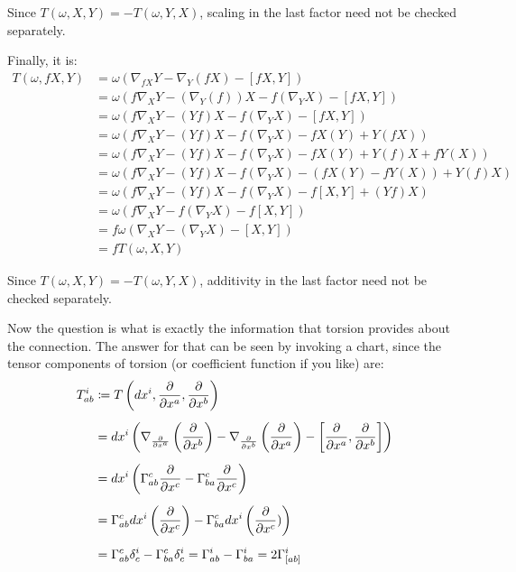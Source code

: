 Since $T(\omega,X,Y) = - T(\omega,Y,X)$, scaling in the last factor need not be checked separately.

\item Finally, it is:
\begin{align*}
T(\omega, fX, Y) & = \omega(\nabla_{fX} Y - \nabla_Y (fX) - [fX,Y]) \\
& = \omega(f\nabla_{X} Y - (\nabla_Y (f))X - f(\nabla_Y X) - [fX,Y]) \\
& = \omega(f\nabla_{X} Y - (Yf)X - f(\nabla_Y X) - [fX,Y]) \\
& = \omega(f\nabla_{X} Y - (Yf)X - f(\nabla_Y X) - fX(Y) + Y(fX)) \\
& = \omega(f\nabla_{X} Y - (Yf)X - f(\nabla_Y X) - fX(Y) + Y(f)X + fY (X))\\
& = \omega(f\nabla_{X} Y - (Yf)X - f(\nabla_Y X) - (fX(Y) - fY(X))+ Y (f)X )\\
& = \omega(f\nabla_{X} Y - (Yf)X - f(\nabla_Y X) - f[X,Y] + (Yf)X) \\
& = \omega(f\nabla_{X} Y - f(\nabla_Y X) - f[X,Y]) \\
& = f\omega(\nabla_{X} Y - (\nabla_Y X) - [X,Y]) \\
&= fT(\omega,X,Y)
\end{align*}

Since $T(\omega,X,Y) = - T(\omega,Y,X)$, additivity in the last factor need not be checked separately.
\eit

Now the question is what is exactly the information that torsion provides about the connection. The answer for that
can be seen by invoking a chart, since the tensor components of torsion (or coefficient function if you like) are:
\begin{align*}
T^{i}_{ab} & \coloneqq T\left(dx^i, \frac{\partial }{\partial x^a}, \frac{\partial }{\partial x^b}\right) \\[5pt]
&= dx^i \left(\nabla_{\frac{\partial }{\partial x^a}} \left(\frac{\partial }{\partial x^b}\right) - \nabla_{\frac{\partial }{\partial x^b}} \left( \frac{\partial }{\partial x^a}\right)
- \left[ \frac{\partial }{\partial x^a},\frac{\partial }{\partial x^b} \right] \right) \\[5pt]
&= dx^i \left( \Gamma^{c}_{ab} \frac{\partial }{\partial x^c} -\Gamma^{c}_{ba} \frac{\partial }{\partial x^c} \right)\\[5pt]
&= \Gamma^{c}_{ab} dx^i \left( \frac{\partial }{\partial x^c} \right) -\Gamma^{c}_{ba} dx^i \left(\frac{\partial }{\partial x^c})\right)\\[5pt]
&= \Gamma^{c}_{ab} \delta^{i}_{c} -\Gamma^{c}_{ba} \delta^{i}_{c} = \Gamma^{i}_{ab} - \Gamma^{i}_{ba} = 2
\Gamma^{i}_{[ab]}
\end{align*}

